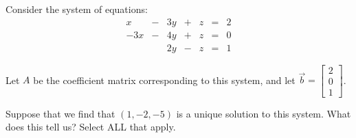 \documentclass{ximera}
\author{}
\begin{document}
\begin{exercise}
Consider the system of equations:
$$\begin{matrix}
      x& -&3y&+&z&=&2\\
      -3x & -&4y&+&z&= &0\\
       & &2y&-&z&=&1
    \end{matrix}$$

Let $A$ be the coefficient matrix corresponding to this system, and let $\vec{b}=\begin{bmatrix}2\\0\\1\end{bmatrix}$.

Suppose that we find that  $(1, -2, -5)$ is a unique solution to this system.  What does this tell us?  Select ALL that apply.

\begin{selectAll}
 \end{selectAll}
\end{exercise}
\end{document}

